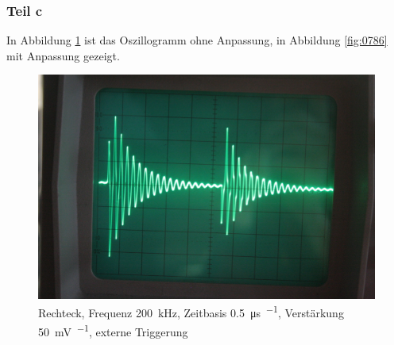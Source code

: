 \FloatBarrier
\subsubsection{Teil c}

In Abbildung \ref{fig:0767} ist das Oszillogramm ohne Anpassung, in Abbildung
\ref{fig:0786} mit Anpassung gezeigt.

\begin{figure}
	\centering
	\begin{minipage}{.45\linewidth}
	\end{minipage}
	\hfill
	\begin{minipage}{.45\linewidth}
	\includegraphics[width=\linewidth]{Fotos/IMG_0767-1500.jpg}
	\end{minipage}
	\caption{%
		Rechteck, Frequenz \SI{200}{\kilo\hertz},
		Zeitbasis \SI{.5}{\micro\second\per\division},
		Verstärkung \SI{50}{\milli\volt\per\division},
		externe Triggerung
	}
	\label{fig:0767}
\end{figure}

